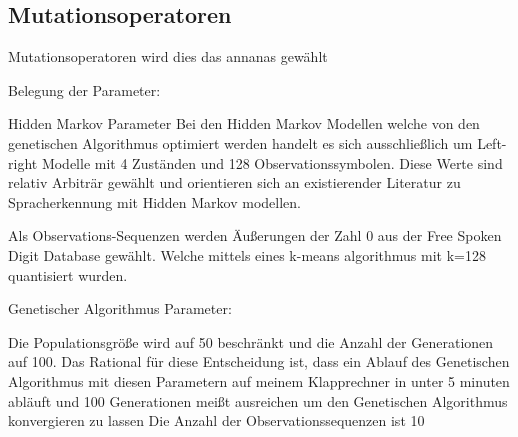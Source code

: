 \subsection*{Mutationsoperatoren}
Mutationsoperatoren wird dies das annanas gewählt


Belegung der Parameter:

Hidden Markov Parameter 
Bei den Hidden Markov Modellen welche von den genetischen Algorithmus optimiert werden handelt es sich 
ausschließlich um Left-right Modelle mit 4 Zuständen und 128 Observationssymbolen.
Diese Werte sind relativ Arbiträr gewählt und orientieren sich an existierender Literatur zu Spracherkennung mit Hidden Markov modellen.

Als Observations-Sequenzen werden Äußerungen der Zahl 0 aus der Free Spoken Digit Database gewählt.
Welche mittels eines k-means algorithmus mit k=128 quantisiert wurden.


Genetischer Algorithmus Parameter:

Die Populationsgröße wird auf 50 beschränkt und die Anzahl der Generationen auf 100.
Das Rational für diese Entscheidung ist, dass ein Ablauf des Genetischen Algorithmus mit diesen Parametern
auf meinem Klapprechner in unter 5 minuten abläuft und 100 Generationen meißt ausreichen um den Genetischen Algorithmus konvergieren zu lassen
Die Anzahl der Observationssequenzen ist 10